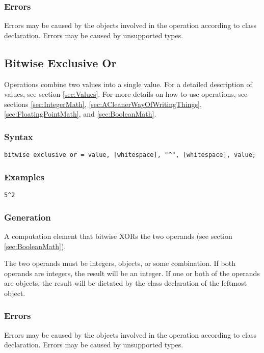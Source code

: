 \documentclass[10pt,a4paper]{article}
\begin{document}
\subsubsection{Errors}
Errors may be caused by the objects involved in the operation according to class declaration. Errors may be caused by unsupported types.

\newpage




\subsection{Bitwise Exclusive Or}
Operations combine two values into a single value. For a detailed description of values, see section \ref{sec:Values}. For more details on how to use operations, see sections \ref{sec:IntegerMath}, \ref{sec:ACleanerWayOfWritingThings}, \ref{sec:FloatingPointMath}, and \ref{sec:BooleanMath}.

\subsubsection{Syntax}
\begin{verbatim}
bitwise exclusive or = value, [whitespace], "^", [whitespace], value;
\end{verbatim}

\subsubsection{Examples}
\begin{verbatim}
5^2
\end{verbatim}

\subsubsection{Generation}
A computation element that bitwise XORs the two operands (see section \ref{sec:BooleanMath}).

The two operands must be integers, objects, or some combination. If both operands are integers, the result will be an integer. If one or both of the operands are objects, the result will be dictated by the class declaration of the leftmost object.

\subsubsection{Errors}
Errors may be caused by the objects involved in the operation according to class declaration. Errors may be caused by unsupported types.
\end{document}
